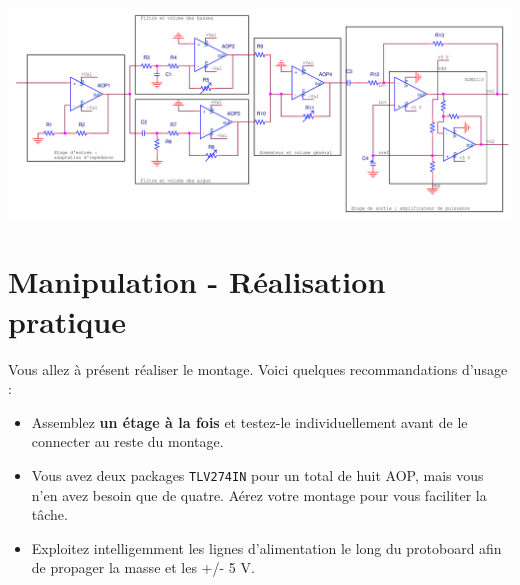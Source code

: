 \begin{minipage}{.7\textwidth}
\begin{center}
\includegraphics[width=26cm, angle=90]{figures/montage_complet.png}
\end{center}
\end{minipage}
\begin{minipage}{.25\textwidth}
\begin{center}
\end{center}
\end{minipage}


\section{Manipulation - Réalisation pratique}
Vous allez à présent réaliser le montage. Voici quelques recommandations d'usage :

\begin{itemize}
	\item Assemblez \textbf{un étage à la fois} et testez-le individuellement avant de le connecter au reste du montage.
	\item Vous avez deux packages \texttt{TLV274IN} pour un total de huit AOP, mais vous n'en avez besoin que de quatre. Aérez votre montage pour vous faciliter la tâche.
	\item Exploitez intelligemment les lignes d'alimentation le long du protoboard afin de propager la masse et les +/- 5 V.
\end{itemize}

